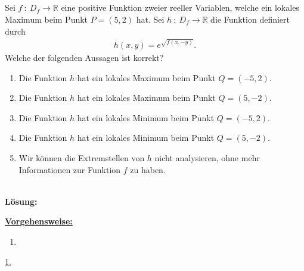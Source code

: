 \subsection*{}
Sei $ f \ : \ D_f \to \mathbb{R} $ eine positive Funktion zweier reeller Variablen, welche ein lokales Maximum beim Punkt $ P = (5,2)  $ hat.
Sei $ h  \ : \ D_f \to \mathbb{R} $ die Funktion definiert durch
\begin{align*}
	h(x,y) = e^{\sqrt{f(x,-y)}}.
\end{align*} 
Welche der folgenden Aussagen ist korrekt?
\renewcommand{\labelenumi}{(\alph{enumi})}
\begin{enumerate}
	\item Die Funktion $ h $ hat ein lokales Maximum beim Punkt $ Q = (-5,2). $
	\item Die Funktion $ h $ hat ein lokales Maximum beim Punkt $ Q = (5,-2). $
	\item Die Funktion $ h $ hat ein lokales Minimum beim Punkt $ Q = (-5,2). $
	\item Die Funktion $ h $ hat ein lokales Minimum beim Punkt $ Q = (5,-2). $
	\item Wir können die Extremstellen von $ h $ nicht analysieren, ohne mehr Informationen zur Funktion $ f $ zu haben.
\end{enumerate}
\ \\
\textbf{Lösung:}
\begin{mdframed}
	\underline{\textbf{Vorgehensweise:}}
	\renewcommand{\labelenumi}{\theenumi.}
	\begin{enumerate}
		\item 
	\end{enumerate}
\end{mdframed}
\underline{1. }\\

\newpage
